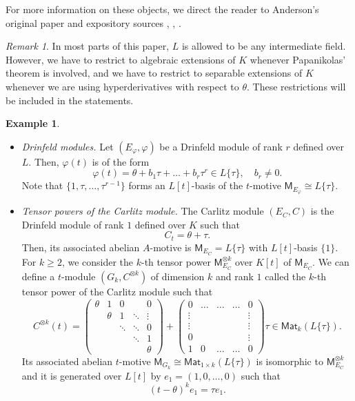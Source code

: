 \documentclass[10pt,a4paper]{amsart}
\theoremstyle{plain} %
\theoremstyle{definition}
\newtheorem{Example}[Theorem]{Example}
\theoremstyle{remark}
\newtheorem{Remark}[Theorem]{Remark}
\newcommand{\Mat}{\mathsf{Mat}}
\newcommand{\mot}{\mathsf{M}}  %
\numberwithin{equation}{subsection}
\begin{document}
For more information on these objects, we direct the reader to Anderson's original paper \cite{ga:tm} and expository sources \cite{db-mp:ridmtt}, \cite{dg:bsffa}, \cite{dt:gsff}.

\begin{Remark}
    In most parts of this paper, $L$ is allowed to be any intermediate field. However, we have to restrict to algebraic extensions of $K$ whenever Papanikolas' theorem is involved, and we have to restrict to separable extensions of $K$ whenever we are using hyperderivatives with respect to $\theta$. These restrictions will be included in the statements.
\end{Remark}

\begin{Example}\label{E:Drinfeld1CarlitzTensor1}
\begin{itemize} 
\item[(i)] \emph{Drinfeld modules.}  Let $(E_\varphi, \varphi)$ be a Drinfeld module of rank $r$ defined over $L$. 
Then, $\varphi(t)$ is of the form
\[
\varphi(t) = \theta + b_1\tau+\dots + b_r\tau^r \in L\{\tau\}, \quad b_r \neq 0.
\]
Note that $\{1, \tau, \dots, \tau^{r-1}\}$ forms an $L[t]$-basis of the $t$-motive $\mot_{E_\varphi}\cong L\{\tau\}$. 


\item[(ii)] \emph{Tensor powers of the Carlitz module.} The Carlitz module $(E_C,C)$ is the Drinfeld module of rank $1$ defined over $K$ such that
\[
C_t = \theta +\tau. 
\]
Then, its associated abelian $A$-motive is $\mot_{E_C} = L\{\tau\}$ with $L[t]$-basis $\{1\}$. 
For $k \geq 2$, we consider the $k$-th tensor power $\mot_{E_C}^{\otimes k}$ over $K[t]$ of $\mot_{E_C}$. We can define a $t$-module $(G_k, C^{\otimes k})$ of dimension $k$ and rank $1$ called the $k$-th tensor power of the Carlitz module such that
\[
C^{\otimes k}(t)= \begin{pmatrix}
\theta & 1& 0 && 0\\
&\theta & 1&  \ddots&\vdots\\
&&\ddots&\ddots&0\\
&&&\ddots&1\\
&&&&\theta
\end{pmatrix} +\begin{pmatrix}
0&\dots &\dots &\dots& 0\\
\vdots& & &  &\vdots\\
\vdots&&&&\vdots\\
0&&&&\vdots\\
1&0&\dots&\dots&0
\end{pmatrix}\tau \in \Mat_k(L\{\tau\}).
\]
Its associated abelian $t$-motive $\mot_{G_k} \cong \Mat_{1\times k}(L\{\tau\})$ is isomorphic to $\mot_{E_C}^{\otimes k}$ and it is generated over $L[t]$ by $e_1=(1,0, \dots, 0)$ such that
\begin{equation}\label{E:Cntaut}
(t-\theta)^k e_1 = \tau e_1. 
\end{equation}
\end{itemize}
\end{Example}
\end{document}
